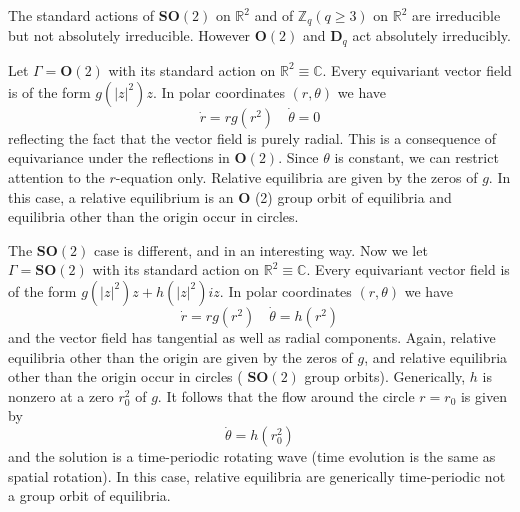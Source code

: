 \documentclass{scrartcl}
\begin{document}
    \begin{example}\label{notes_normal_forms:ex:4.4}
      The standard actions of \(\mathbf{S O}(2)\) on \(\mathbb{R}^{2}\) and of \(\mathbb{Z}_{q}(q \geq 3)\) on \(\mathbb{R}^{2}\) are irreducible but not absolutely irreducible.
      However \(\mathbf{O}(2)\) and \(\mathbf{D}_{q}\) act absolutely irreducibly.
    \end{example}
    \begin{example}\label{golubitsky2000symmetry:ex:6.1}
      Let \(\Gamma=\mathbf{O}(2)\) with its standard action on \(\mathbb{R}^{2} \equiv \mathbb{C}\).
      Every equivariant vector field is of the form \(g\left(|z|^{2}\right) z\).
      In polar coordinates \((r, \theta)\) we have
      \begin{equation*}
        \dot{r}=r g\left(r^{2}\right) \quad \dot{\theta}=0
      \end{equation*}
      reflecting the fact that the vector field is purely radial.
      This is a consequence of equivariance under the reflections in \(\mathbf{O}(2)\).
      Since \(\theta\) is constant, we can restrict attention to the \(r\)-equation only.
      Relative equilibria are given by the zeros of \(g\).
      In this case, a relative equilibrium is an \(\mathbf{O}\) (2) group orbit of equilibria and equilibria other than the origin occur in circles.
    \end{example}
    \begin{example}\label{golubitsky2000symmetry:ex:6.2}
      The \(\mathbf{S O}(2)\) case is different, and in an interesting way.
      Now we let \(\Gamma=\mathbf{S O}(2)\) with its standard action on \(\mathbb{R}^{2} \equiv \mathbb{C}\).
      Every equivariant vector field is of the form \(g\left(|z|^{2}\right) z + h\left(|z|^{2}\right) i z\).
      In polar coordinates \((r, \theta)\) we have
      \begin{equation*}
        \dot{r}=r g\left(r^{2}\right) \quad \dot{\theta}=h\left(r^{2}\right)
      \end{equation*}
      and the vector field has tangential as well as radial components.
      Again, relative equilibria other than the origin are given by the zeros of \(g\), and relative equilibria other than the origin occur in circles ( \(\mathbf{S O}(2)\) group orbits).
      Generically, \(h\) is nonzero at a zero \(r_{0}^{2}\) of \(g\).
      It follows that the flow around the circle \(r = r_{0}\) is given by
      \begin{equation*}
        \dot{\theta}=h\left(r_{0}^{2}\right)
      \end{equation*}
      and the solution is a time-periodic rotating wave (time evolution is the same as spatial rotation).
      In this case, relative equilibria are generically time-periodic not a group orbit of equilibria.
    \end{example}
\end{document}
